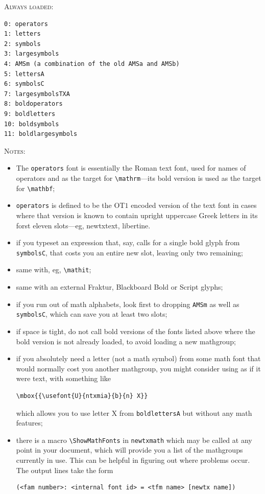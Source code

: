 \documentclass[11pt]{article}
\theoremstyle{oldplain}
\theoremstyle{plain}
\begin{document}
\textsc{Always loaded:}
\begin{verbatim}
0: operators
1: letters
2: symbols
3: largesymbols
4: AMSm (a combination of the old AMSa and AMSb)
5: lettersA
6: symbolsC
7: largesymbolsTXA
8: boldoperators
9: boldletters
10: boldsymbols
11: boldlargesymbols
\end{verbatim}
\textsc{Notes:}
\begin{itemize}
\item
The {\tt operators} font is essentially the Roman text font, used for names of operators and as the target for \verb|\mathrm|---its bold version is used as the target for \verb|\mathbf|;
\item {\tt operators} is defined to be the OT$1$ encoded version of the text font in cases where that version is known to contain upright uppercase Greek letters in its forst eleven slots---eg, newtxtext, libertine.
\item if you typeset an expression that, say, calls for a single bold glyph from  {\tt symbolsC}, that costs you an entire new slot, leaving only two remaining;
\item same with, eg, \verb|\mathit|;
\item same with an external Fraktur, Blackboard Bold or Script glyphs;
\item if you run out of math alphabets, look first to dropping {\tt AMSm}  as well as {\tt symbolsC}, which can save you at least two slots;
\item if space is tight, do not call bold versions of the fonts listed above where the bold version is not already loaded, to avoid loading a new mathgroup; 
\item if you absolutely need a letter (not a math symbol) from some math font that would normally cost you another mathgroup, you might consider using as if it were text, with something like
\begin{verbatim}
\mbox{{\usefont{U}{ntxmia}{b}{n} X}}
\end{verbatim}
which allows you to use letter X from {\tt boldlettersA} but without any math features;
\item there is a macro \verb|\ShowMathFonts| in {\tt newtxmath} which may be called at any point in your document, which will provide you a list of the mathgroups currently in use. This can be helpful in figuring out where problems occur. The output lines take the form
\begin{verbatim}
(<fam number>: <internal font id> = <tfm name> [newtx name])
\end{verbatim}

\end{itemize}
\end{document}
